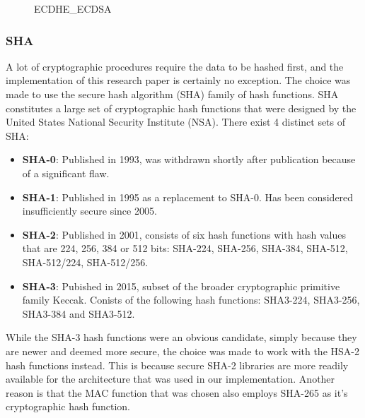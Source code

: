 \documentclass[master=cws,masteroption=vs,english]{kulemt}
\begin{document}
\begin{figure}[h]
	\centering
	\caption{ECDHE\_ECDSA}
	\label{fig:ECDH2}
\end{figure} 

\subsubsection{SHA} A lot of cryptographic procedures require the data to be hashed first, and the implementation of this research paper is certainly no exception. The choice was made to use the secure hash algorithm (SHA) family of hash functions. SHA constitutes a large set of cryptographic hash functions that were designed by the United States National Security Institute (NSA). There exist 4 distinct sets of SHA\cite{wiki:SHA}:

\begin{itemize}
	\item \textbf{SHA-0}: Published in 1993, was withdrawn shortly after publication because of a significant flaw.
	
	\item \textbf{SHA-1}: Published in 1995 as a replacement to SHA-0. Has been considered insufficiently secure since 2005.
	
	\item \textbf{SHA-2}: Published in 2001, consists of six hash functions with hash values that are 224, 256, 384 or 512 bits: SHA-224, SHA-256, SHA-384, SHA-512, SHA-512/224, SHA-512/256.
	
	\item \textbf{SHA-3}: Pubished in 2015, subset of the broader cryptographic primitive family Keccak. Conists of the following hash functions: SHA3-224, SHA3-256, SHA3-384 and SHA3-512.
\end{itemize} 
While the SHA-3 hash functions were an obvious candidate, simply because they are newer and deemed more secure, the choice was made to work with the HSA-2 hash functions instead. This is because secure SHA-2 libraries are more readily available for the architecture that was used in our implementation. Another reason is that the MAC function that was chosen also employs SHA-265 as it's cryptographic hash function. 
\end{document}
